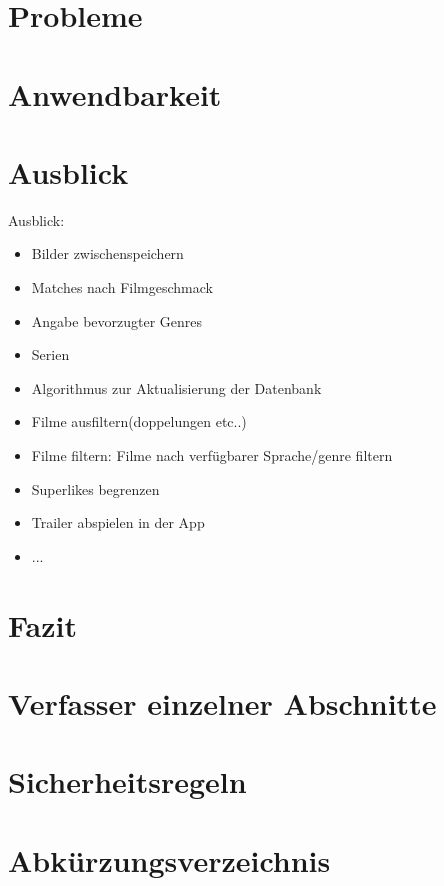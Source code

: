 \documentclass[11pt,a4paper]{article}
\begin{document}
\clearpage
\section{Probleme}
\label{sec:probleme}



\clearpage
\section{Anwendbarkeit}
\label{sec:anwendbarkeit}



\clearpage
\section{Ausblick}
Ausblick:
\begin{itemize}
\item Bilder zwischenspeichern
\item Matches nach Filmgeschmack
\item Angabe bevorzugter Genres
\item Serien
\item Algorithmus zur Aktualisierung der Datenbank
\item Filme ausfiltern(doppelungen etc..)
\item Filme filtern: Filme nach verfügbarer Sprache/genre filtern
\item Superlikes begrenzen
\item Trailer abspielen in der App
\item ...
\end{itemize}
\label{sec:ausblick}



\clearpage
\section{Fazit}
\label{sec:fazit}



\clearpage
\appendix
\section{Verfasser einzelner Abschnitte}

\clearpage
\section{Sicherheitsregeln}

\clearpage

\section*{Abkürzungsverzeichnis}
\end{document}
